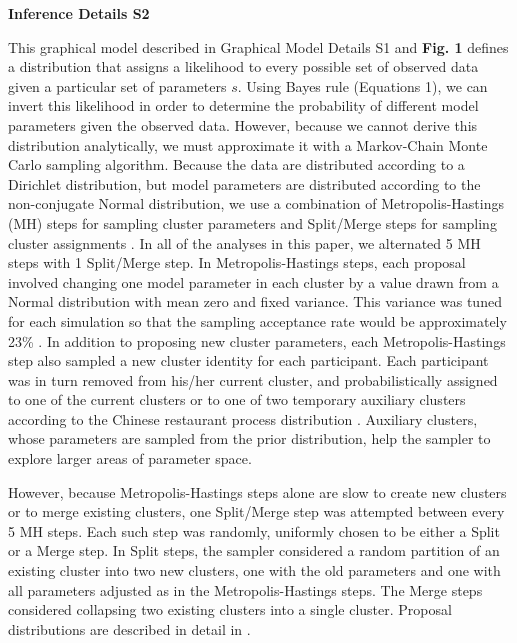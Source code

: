 \documentclass[12pt]{article}
\date{}
\begin{document}
\renewcommand\theequation{S\arabic{equation}}

\begin{center}
{\Large
\textbf{Inference Details S2}
}
\end{center}

This graphical model described in Graphical Model Details S1 and \textbf{Fig. 1} defines a distribution that assigns a likelihood to every possible set of observed data given a particular set of parameters $s$. Using Bayes rule (Equations 1), we can invert this likelihood in order to determine the probability of different model parameters given the observed data. However, because we cannot derive this distribution analytically, we must approximate it with a Markov-Chain Monte Carlo sampling algorithm. Because the data are distributed according to a Dirichlet distribution, but model parameters are distributed according to the non-conjugate Normal distribution, we use a combination of Metropolis-Hastings (MH) steps for sampling cluster parameters and Split/Merge steps for sampling cluster assignments \cite{Neal2000, Jain2007}. In all of the analyses in this paper, we alternated 5 MH steps with 1 Split/Merge step. In Metropolis-Hastings steps, each proposal involved changing one model parameter in each cluster by a value drawn from a Normal distribution with mean zero and fixed variance. This variance was tuned for each simulation so that the sampling acceptance rate would be approximately 23\% \cite{Roberts1997}. In addition to proposing new cluster parameters, each Metropolis-Hastings step also sampled a new cluster identity for each participant. Each participant was in turn removed from his/her current cluster, and probabilistically assigned to one of the current clusters or to one of two temporary auxiliary clusters according to the Chinese restaurant process distribution \cite{Neal2000}. Auxiliary clusters, whose parameters are sampled from the prior distribution, help the sampler to explore larger areas of parameter space.

	However, because Metropolis-Hastings steps alone are slow to create new clusters or to merge existing clusters, one Split/Merge step was attempted between every 5 MH steps. Each such step was randomly, uniformly chosen to be either a Split or a Merge step. In Split steps, the sampler considered a random partition of an existing cluster into two new clusters, one with the old parameters and one with all parameters adjusted as in the Metropolis-Hastings steps. The Merge steps considered collapsing two existing clusters into a single cluster. Proposal distributions are described in detail in \cite{Jain2007}. 
\end{document}
